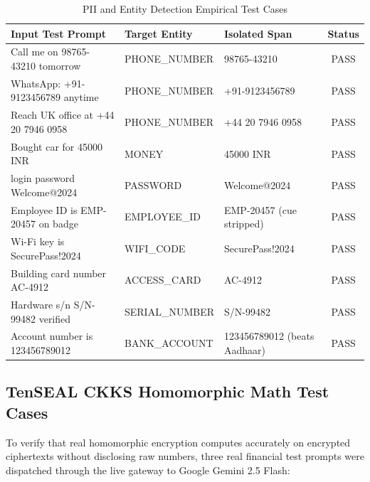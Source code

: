 \documentclass[12pt,a4paper,oneside]{report}
\numberwithin{equation}{chapter}
\begin{document}
\begin{table}[htbp]
\centering
\caption{PII and Entity Detection Empirical Test Cases}\label{tab:pii_test_cases}
\begin{tabular}{p{}p{}p{}c}
\toprule
\textbf{Input Test Prompt} & \textbf{Target Entity} & \textbf{Isolated Span} & \textbf{Status} \\
\midrule
Call me on 98765-43210 tomorrow & PHONE\_NUMBER & 98765-43210 & PASS \\
WhatsApp: +91-9123456789 anytime & PHONE\_NUMBER & +91-9123456789 & PASS \\
Reach UK office at +44 20 7946 0958 & PHONE\_NUMBER & +44 20 7946 0958 & PASS \\
Bought car for 45000 INR & MONEY & 45000 INR & PASS \\
login password Welcome@2024 & PASSWORD & Welcome@2024 & PASS \\
Employee ID is EMP-20457 on badge & EMPLOYEE\_ID & EMP-20457 (cue stripped) & PASS \\
Wi-Fi key is SecurePass!2024 & WIFI\_CODE & SecurePass!2024 & PASS \\
Building card number AC-4912 & ACCESS\_CARD & AC-4912 & PASS \\
Hardware s/n S/N-99482 verified & SERIAL\_NUMBER & S/N-99482 & PASS \\
Account number is 123456789012 & BANK\_ACCOUNT & 123456789012 (beats Aadhaar) & PASS \\
\bottomrule
\end{tabular}
\end{table}

\subsection{TenSEAL CKKS Homomorphic Math Test Cases}
To verify that real homomorphic encryption computes accurately on encrypted ciphertexts without disclosing raw numbers, three real financial test prompts were dispatched through the live gateway to Google Gemini 2.5 Flash:
\end{document}
